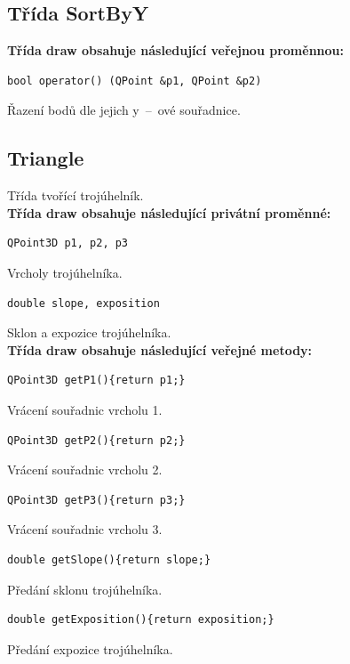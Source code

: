 \documentclass[a4paper, 12pt, oneside, titlepage]{article} %
\begin{document}
\subsection{Třída SortByY}
\textbf{Třída draw obsahuje následující veřejnou proměnnou:}
\begin{verbatim}
bool operator() (QPoint &p1, QPoint &p2)
\end{verbatim}
Řazení bodů dle jejich y~--~ové souřadnice.\\

\subsection{Triangle}
Třída tvořící trojúhelník.\\
\textbf{Třída draw obsahuje následující privátní proměnné:}
\begin{verbatim}
QPoint3D p1, p2, p3
\end{verbatim}
Vrcholy trojúhelníka.\\

\begin{verbatim}
double slope, exposition
\end{verbatim}
Sklon a expozice trojúhelníka.\\

\textbf{Třída draw obsahuje následující veřejné metody:}
\begin{verbatim}
QPoint3D getP1(){return p1;}
\end{verbatim}
Vrácení souřadnic vrcholu 1.\\

\begin{verbatim}
QPoint3D getP2(){return p2;}
\end{verbatim}
Vrácení souřadnic vrcholu 2.\\

\begin{verbatim}
QPoint3D getP3(){return p3;}
\end{verbatim}
Vrácení souřadnic vrcholu 3.\\

\begin{verbatim}
double getSlope(){return slope;}
\end{verbatim}
Předání sklonu trojúhelníka.\\

\begin{verbatim}
double getExposition(){return exposition;}
\end{verbatim}
Předání expozice trojúhelníka.\\
\end{document}
